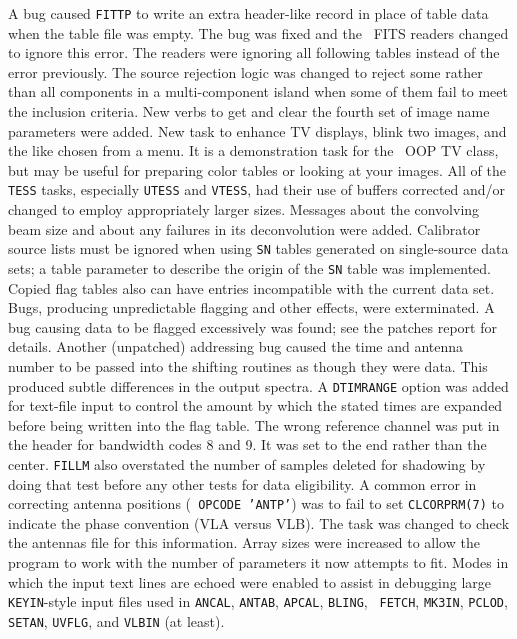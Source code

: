 \begin{description}
 A bug caused {\tt FITTP} to write an extra header-like
   record in place of table data when the table file was empty.  The
   bug was fixed and the \AIPS\ FITS readers changed to ignore this
   error.  The readers were ignoring all following tables instead of
   the error previously.
 The source rejection logic was changed to reject some
   rather than all components in a multi-component island when some of
   them fail to meet the inclusion criteria.
 New verbs to get and clear the fourth set of image
   name parameters were added.
 New task to enhance TV displays, blink two images, and
   the like chosen from a menu.  It is a demonstration task for the
   \AIPS\ OOP TV class, but may be useful for preparing color tables
   or looking at your images.
 All of the {\tt *TESS} tasks, especially {\tt UTESS}
   and {\tt VTESS}, had their use of buffers corrected and/or changed
   to employ appropriately larger sizes.
 Messages about the convolving beam size and about any
   failures in its deconvolution were added.
 Calibrator source lists must be ignored when
   using {\tt SN} tables generated on single-source data sets; a table
   parameter to describe the origin of the {\tt SN} table was
   implemented.
 Copied flag tables also can have entries
   incompatible with the current data set.  Bugs, producing
   unpredictable flagging and other effects, were exterminated.
 A bug causing data to be flagged excessively was found;
   see the patches report for details.  Another (unpatched) addressing
   bug caused the time and antenna number to be passed into the
   shifting routines as though they were data.  This produced subtle
   differences in the output spectra.
 A {\tt DTIMRANGE} option was added for text-file input
   to control the amount by which the stated times are expanded before
   being written into the flag table.
 The wrong reference channel was put in the header for
   bandwidth codes 8 and 9.  It was set to the end rather than the
   center.  {\tt FILLM} also overstated the number of samples deleted
   for shadowing by doing that test before any other tests for data
   eligibility.
 A common error in correcting antenna positions ({\tt
   OPCODE 'ANTP'}) was to fail to set {\tt CLCORPRM(7)} to indicate
   the phase convention (VLA versus \hbox{VLB}).  The task was changed
   to check the antennas file for this information.
 Array sizes were increased to allow the program to work
   with the number of parameters it now attempts to fit.
 Modes in which the input text lines are echoed were
   enabled to assist in debugging large {\tt KEYIN}-style input files
   used in {\tt ANCAL}, {\tt ANTAB}, {\tt APCAL}, {\tt BLING}, {\tt
   FETCH}, {\tt MK3IN}, {\tt PCLOD}, {\tt SETAN}, {\tt UVFLG}, and
   {\tt VLBIN} (at least).
\end{description}

